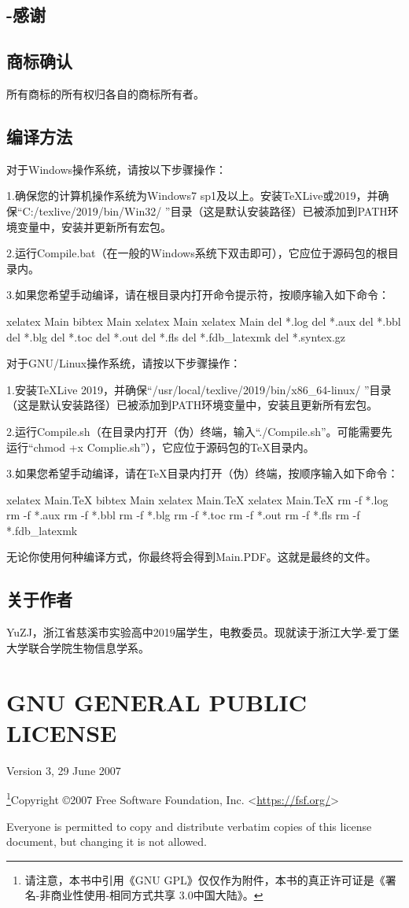 \subsection{-感谢}
\subsection{商标确认}
所有商标的所有权归各自的商标所有者。
\subsection{编译方法}
对于Windows操作系统，请按以下步骤操作：\par
1.确保您的计算机操作系统为Windows7 sp1及以上。安装TeXLive或2019，并确保“C:/texlive/2019/bin/Win32/ ”目录（这是默认安装路径）已被添加到PATH环境变量中，安装并更新所有宏包。\par
2.运行Compile.bat（在一般的Windows系统下双击即可），它应位于源码包的根目录内。\par
3.如果您希望手动编译，请在根目录内打开命令提示符，按顺序输入如下命令：
\begin{verbatim*}
xelatex Main
bibtex Main
xelatex Main
xelatex Main
del *.log
del *.aux
del *.bbl
del *.blg
del *.toc
del *.out
del *.fls
del *.fdb_latexmk
del *.syntex.gz
\end{verbatim*}
对于GNU/Linux操作系统，请按以下步骤操作：\par
1.安装TeXLive 2019，并确保“/usr/local/texlive/2019/bin/x86\_64-linux/ ”目录（这是默认安装路径）已被添加到PATH环境变量中，安装且更新所有宏包。\par
2.运行Compile.sh（在目录内打开（伪）终端，输入“./Compile.sh”。可能需要先运行“chmod +x Complie.sh”），它应位于源码包的TeX目录内。\par
3.如果您希望手动编译，请在TeX目录内打开（伪）终端，按顺序输入如下命令：
\begin{verbatim*}
xelatex Main.TeX
bibtex Main
xelatex Main.TeX
xelatex Main.TeX
rm -f *.log
rm -f *.aux
rm -f *.bbl
rm -f *.blg
rm -f *.toc
rm -f *.out
rm -f *.fls
rm -f *.fdb_latexmk
\end{verbatim*}
无论你使用何种编译方式，你最终将会得到Main.PDF。这就是最终的文件。
\subsection{关于作者}
YuZJ，浙江省慈溪市实验高中2019届学生，电教委员。现就读于浙江大学-爱丁堡大学联合学院生物信息学系。
\section{GNU GENERAL PUBLIC LICENSE}
\begin{center} Version 3, 29 June 2007 \end{center}
\footnote{请注意，本书中引用《GNU GPL》仅仅作为附件，本书的真正许可证是《署名-非商业性使用-相同方式共享 3.0中国大陆》。}\cite{gpl}Copyright \copyright 2007 Free Software Foundation, Inc. <\url{https://fsf.org/}>\par
Everyone is permitted to copy and distribute verbatim copies of this license document, but changing it is not allowed.\par
